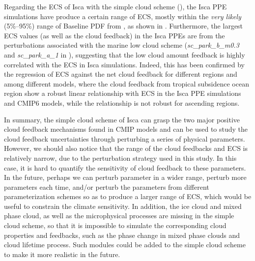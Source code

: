Regarding the ECS of Isca with the simple cloud scheme (), the Isca PPE simulations have produce a certain range of ECS, mostly within the \textit{very likely} (5\%--95\%) range of Baseline PDF from \cite{Sherwood2020}, as shown in . Furthermore, the largest ECS values (as well as the cloud feedback) in the Isca PPEs are from the perturbations associated with the marine low cloud scheme (\textit{sc\_park\_b\_m0.3} and \textit{sc\_park\_a\_1} in ), suggesting that the low cloud amount feedback is highly correlated with the ECS in Isca simulations. Indeed, this has been confirmed by the regression of ECS against the net cloud feedback for different regions and among different models, where the cloud feedback from tropical subsidence ocean region show a robust linear relationship with ECS in the Isca PPE simulations and CMIP6 models, while the relationship is not robust for ascending regions.

In summary, the simple cloud scheme of Isca can grasp the two major positive cloud feedback mechanisms found in CMIP models and can be used to study the cloud feedback uncertainties through perturbing a series of physical parameters. However, we should also notice that the range of the cloud feedbacks and ECS is relatively narrow, due to the perturbation strategy used in this study. In this case, it is hard to quantify the sensitivity of cloud feedback to these parameters. In the future, perhaps we can perturb parameter in a wider range, perturb more parameters each time, and/or perturb the parameters from different parameterization schemes so as to produce a larger range of ECS, which would be useful to constrain the climate sensitivity. In addition, the ice cloud and mixed phase cloud, as well as the microphysical processes are missing in the simple cloud scheme, so that it is impossible to simulate the corresponding cloud properties and feedbacks, such as the phase change in mixed phase clouds and cloud lifetime process. Such modules could be added to the simple cloud scheme to make it more realistic in the future.
